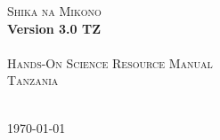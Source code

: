 \begin{titlepage}
\begin{center}
	\textsc{{\Huge Shika na Mikono}}\\[0.4cm]
	\textbf{{\huge Version 3.0 TZ}}\\[1.5cm]
	\HRule\\[0.4cm]
	\textsc{{\Large Hands-On Science Resource Manual}}\\[0.4cm]
	\textsc{{\Large Tanzania}}\\[0.4cm]
	\HRule\\[0.5cm]
\end{center}

\vfill
\begin{center}
	{\large \today}
\end{center}
\end{titlepage}
